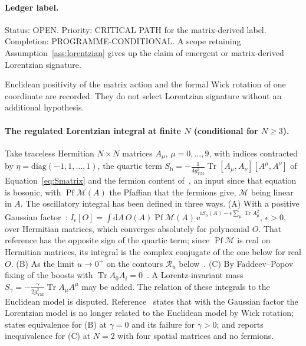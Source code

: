 \paragraph{Ledger label.}
Status: OPEN. Priority: CRITICAL PATH for the matrix-derived label.
Completion: PROGRAMME-CONDITIONAL. A scope retaining
Assumption~\ref{ass:lorentzian} gives up the claim of emergent or
matrix-derived Lorentzian signature.

Euclidean positivity of the matrix action and the formal Wick rotation of
one coordinate are recorded. They do not select Lorentzian signature without
an additional hypothesis.

\paragraph{The regulated Lorentzian integral at finite \(N\) (conditional for \(N\ge3\)).}
Take traceless Hermitian \(N\times N\) matrices \(A_\mu\), \(\mu=0,\dots,9\), with indices contracted by \(\eta=\mathrm{diag}(-1,1,\dots,1)\), the quartic term \(S_{\mathrm b}=-\tfrac1{4g_{\mathrm{YM}}^2}\operatorname{Tr}[A_\mu,A_\nu][A^\mu,A^\nu]\) of Equation~\eqref{eq:Smatrix} and the fermion content of~\cite{IKKT1997}, an input since that equation is bosonic, with \(\operatorname{Pf}\mathcal M(A)\) the Pfaffian that the fermions give, \(\mathcal M\) being linear in \(A\). The oscillatory integral has been defined in three ways. (A) With a positive Gaussian factor~\cite{Steinacker2026Invitation}: \(I_\epsilon[O]=\int\mathrm dA\,O(A)\operatorname{Pf}\mathcal M(A)\,\mathrm e^{\mathrm iS_{\mathrm b}(A)-\epsilon\sum_\mu\operatorname{Tr}A_\mu^2}\), \(\epsilon>0\), over Hermitian matrices, which converges absolutely for polynomial \(O\). That reference has the opposite sign of the quartic term; since \(\operatorname{Pf}\mathcal M\) is real on Hermitian matrices, its integral is the complex conjugate of the one below for real \(O\). (B) As the limit \(u\to0^+\) on the contours \(\mathcal R_u\) below~\cite{Anagnostopoulos2026}. (C) By Faddeev--Popov fixing of the boosts with \(\operatorname{Tr}A_0A_i=0\)~\cite{AsanoNishimuraPiensukYamamori2025}. A Lorentz-invariant mass \(S_\gamma=-\tfrac{\gamma}{2g_{\mathrm{YM}}^2}\operatorname{Tr}A_\mu A^\mu\) may be added. The relation of these integrals to the Euclidean model is disputed. Reference~\cite{Steinacker2026Invitation} states that with the Gaussian factor the Lorentzian model is no longer related to the Euclidean model by Wick rotation; \cite{Anagnostopoulos2026} states equivalence for (B) at \(\gamma=0\) and its failure for \(\gamma>0\); and \cite{ChouNishimuraTripathi2025} reports inequivalence for (C) at \(N=2\) with four spatial matrices and no fermions.

